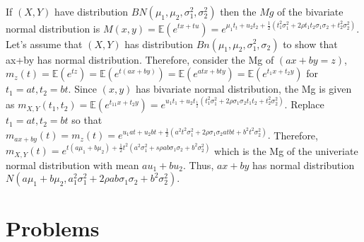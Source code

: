 \documentclass{article}
\begin{document}
\begin{enumerate}
    If $(X,Y)$ have distribution $BN(\mu_1, \mu_2, \sigma_1^2, \sigma_2^2)$ then the $Mg$ of the bivariate normal distribution is $M(x, y)=\mathbb{E}(e^{tx+tu})=e^{\mu_1t_t+u_2t_2+\frac{1}{2}(t_1^2\sigma_1^2+2\rho t_1t_2\sigma_1\sigma_2+t_2^2\sigma_2^2)}$. Let's assume that $(X,Y)$ has distribution $Bn(\mu_1, \mu_2, \sigma_1^2, \sigma_2)$ to show that ax+by has normal distribution. Therefore, consider the Mg of $(ax+by=z)$, $m_z(t)=\mathbb{E}(e^{tz})=\mathbb{E}(e^{t(ax+by)})=\mathbb{E}(e^{atx+bty})=\mathbb{E}(e^{t_1x+t_2y})$ for $t_1=at, t_2=bt.$ Since $(x, y)$ has bivariate normal distribution, the Mg is given as $m_{X,Y}(t_1, t_2)=\mathbb{E}(e^{t_11x+t_2y})=e^{u_1t_1+u_2t_\frac{1}{2}(t_1^2\sigma_1^2+2\rho\sigma_1\sigma_2t_1t_2+t_2^2\sigma_2^2)}.$ Replace $t_1=at, t_2=bt$ so that $m_{ax+by}(t)=m_z(t)=e^{u_1at+u_2bt+\frac{1}{2}(a^2t^2\sigma_1^2+2\rho\sigma_1\sigma_2atbt+b^2t^2\sigma_2^2)}.$ Therefore, $m_{X, Y}(t)=e^{t(a\mu_1+b\mu_2)+\frac{1}{2}t^2(a^2\sigma_1^2+s\rho a b\sigma_1\sigma_2+b^2\sigma_2^2)}$ which is the Mg of the univeriate normal distribution with mean $au_1+bu_2$. Thus, $ax+by$ has normal distribution $N(a\mu_1+b\mu_2, a_1^2\sigma_1^2+2\rho ab\sigma_1\sigma_2+b^2\sigma_2^2).$
    
\end{enumerate}

\section{Problems}
\end{document}
